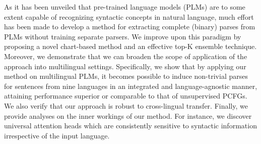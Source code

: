 As it has been unveiled that pre-trained language models (PLMs) are to some extent capable of recognizing syntactic concepts in natural language, much effort has been made to develop a method for extracting complete (binary) parses from PLMs without training separate parsers. We improve upon this paradigm by proposing a novel chart-based method and an effective top-K ensemble technique. Moreover, we demonstrate that we can broaden the scope of application of the approach into multilingual settings. Specifically, we show that by applying our method on multilingual PLMs, it becomes possible to induce non-trivial parses for sentences from nine languages in an integrated and language-agnostic manner, attaining performance superior or comparable to that of unsupervised PCFGs. We also verify that our approach is robust to cross-lingual transfer. Finally, we provide analyses on the inner workings of our method. For instance, we discover universal attention heads which are consistently sensitive to syntactic information irrespective of the input language.
